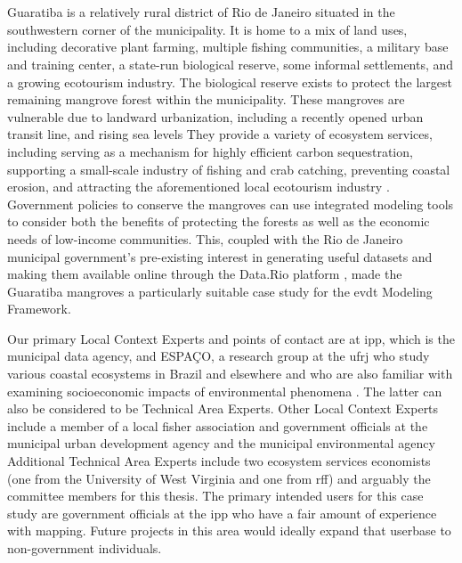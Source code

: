 \chapter{} \label{ch:mangroves}



\section{}

Guaratiba is a relatively rural district of Rio de Janeiro situated in the southwestern corner of the municipality. It is home to a mix of land uses, including decorative plant farming, multiple fishing communities, a military base and training center, a state-run biological reserve, some informal settlements, and a growing ecotourism industry. The biological reserve exists to protect the largest remaining mangrove forest within the municipality. These mangroves are vulnerable due to landward urbanization, including a recently opened urban transit line, and rising sea levels \cite{goldbergEcoMapDecisionsupportTool2018} They provide a variety of ecosystem services, including serving as a mechanism for highly efficient carbon sequestration, supporting a small-scale industry of fishing and crab catching, preventing coastal erosion, and attracting the aforementioned local ecotourism industry \cite{schwenkResearchEnvironmentalSocioeconomical2008}. Government policies to conserve the mangroves can use integrated modeling tools to consider both the benefits of protecting the forests as well as the economic needs of low-income communities. This, coupled with the Rio de Janeiro municipal government's pre-existing interest in generating useful datasets and making them available online through the Data.Rio platform \cite{matheusOpenGovernmentData2014}, made the Guaratiba mangroves a particularly suitable case study for the \ac{evdt} Modeling Framework.

Our primary Local Context Experts and points of contact are at \ac{ipp}, which is the municipal data agency, and ESPAÇO, a research group at the \ac{ufrj} who study various coastal ecosystems in Brazil and elsewhere \cite{cruzClassificacaoOrientadaObjetos2007, seabraMapeamentoDinamicaCobertura2013} and who are also familiar with examining socioeconomic impacts of environmental phenomena \cite{schwenkResearchEnvironmentalSocioeconomical2008}. The latter can also be considered to be Technical Area Experts. Other Local Context Experts include a member of a local fisher association and government officials at the municipal urban development agency and the municipal environmental agency Additional Technical Area Experts include two ecosystem services economists (one from the University of West Virginia and one from \ac{rff}) and arguably the committee members for this thesis. The primary intended users for this case study are government officials at the \ac{ipp} who have a fair amount of experience with mapping. Future projects in this area would ideally expand that userbase to non-government individuals. 

